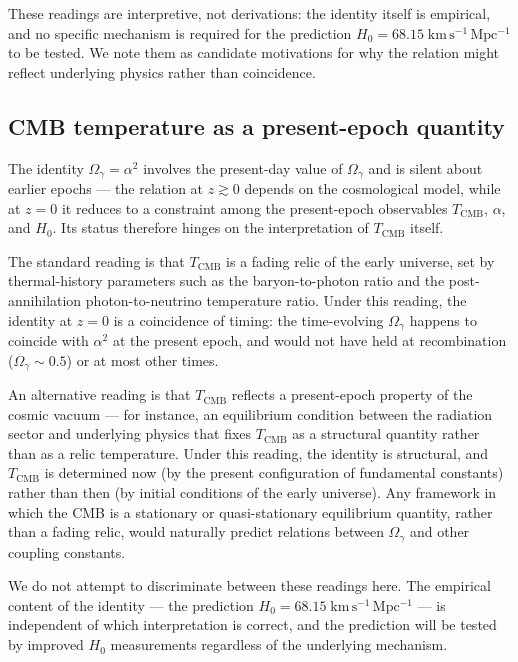 \documentclass[12pt, a4paper]{article}
\begin{document}
These readings are interpretive, not derivations: the identity itself is empirical, and no specific mechanism is required for the prediction $H_0 = 68.15\;\mathrm{km\,s^{-1}\,Mpc^{-1}}$ to be tested. We note them as candidate motivations for why the relation might reflect underlying physics rather than coincidence.


\subsection{CMB temperature as a present-epoch quantity}
\label{sec:present_epoch}

The identity $\Omega_\gamma = \alpha^2$ involves the present-day value of $\Omega_\gamma$ and is silent about earlier epochs --- the relation at $z \gtrsim 0$ depends on the cosmological model, while at $z = 0$ it reduces to a constraint among the present-epoch observables $T_{\mathrm{CMB}}$, $\alpha$, and $H_0$. Its status therefore hinges on the interpretation of $T_{\mathrm{CMB}}$ itself.

The standard reading is that $T_{\mathrm{CMB}}$ is a fading relic of the early universe, set by thermal-history parameters such as the baryon-to-photon ratio and the post-annihilation photon-to-neutrino temperature ratio. Under this reading, the identity at $z=0$ is a coincidence of timing: the time-evolving $\Omega_\gamma$ happens to coincide with $\alpha^2$ at the present epoch, and would not have held at recombination ($\Omega_\gamma \sim 0.5$) or at most other times.

An alternative reading is that $T_{\mathrm{CMB}}$ reflects a present-epoch property of the cosmic vacuum --- for instance, an equilibrium condition between the radiation sector and underlying physics that fixes $T_{\mathrm{CMB}}$ as a structural quantity rather than as a relic temperature. Under this reading, the identity is structural, and $T_{\mathrm{CMB}}$ is determined now (by the present configuration of fundamental constants) rather than then (by initial conditions of the early universe). Any framework in which the CMB is a stationary or quasi-stationary equilibrium quantity, rather than a fading relic, would naturally predict relations between $\Omega_\gamma$ and other coupling constants.

We do not attempt to discriminate between these readings here. The empirical content of the identity --- the prediction $H_0 = 68.15\;\mathrm{km\,s^{-1}\,Mpc^{-1}}$ --- is independent of which interpretation is correct, and the prediction will be tested by improved $H_0$ measurements regardless of the underlying mechanism.
\end{document}
